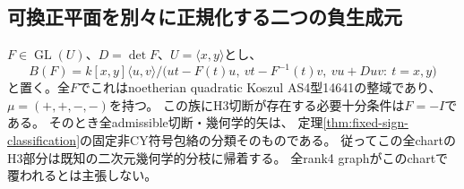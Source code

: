 \subsection{可換正平面を別々に正規化する二つの負生成元}
\label{subsec:h3-order2-22-rank4-separated-commutative}
\begin{theorem}
\label{thm:h3-order2-22-rank4-separated-commutative}
$F\in\operatorname{GL}(U)$、$D=\det F$、$U=\langle x,y\rangle$とし、
\[
 B(F)=k[x,y]\langle u,v\rangle/
 \bigl(ut-F(t)u,\ vt-F^{-1}(t)v,\ vu+Duv:\ t=x,y\bigr)
\]
と置く。全$F$でこれはnoetherian quadratic Koszul AS4型14641の整域であり、
$\mu=(+,+,-,-)$を持つ。
この族にH3切断が存在する必要十分条件は$F=-I$である。
そのとき全admissible切断・幾何学的矢は、
定理\ref{thm:fixed-sign-classification}の固定非CY符号包絡の分類そのものである。
従ってこの全chartのH3部分は既知の二次元幾何学的分枝に帰着する。
全rank4 graphがこのchartで覆われるとは主張しない。
\end{theorem}
